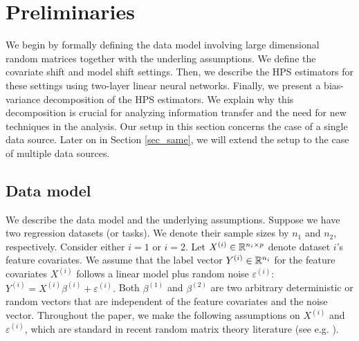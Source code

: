 \section{Preliminaries}\label{sec_HPS}
We begin by formally defining the data model involving large dimensional random matrices together with the underling assumptions.
We define the covariate shift and model shift settings.
Then, we describe the HPS estimators for these settings using two-layer linear neural networks.
Finally, we present a bias-variance decomposition of the HPS estimators.
We explain why this decomposition is crucial for analyzing information transfer and the need for new techniques in the analysis.
Our setup in this section concerns the case of a single data source.
Later on in Section \ref{sec_same}, we will extend the setup to the case of multiple data sources.

\subsection{Data model}\label{sec_data}

We describe the data model and the underlying assumptions.
Suppose we have two regression datasets (or tasks).
We denote their sample sizes by $n_1$ and $n_2$, respectively.
Consider either $i = 1$ or $i = 2$.
Let $X^{(i)} \in \mathbb{R}^{n_i \times p}$ denote dataset $i$'s feature covariates.
We assume that the label vector $Y^{(i)} \in \mathbb{R}^{n_i}$ for the feature covariates $X^{(i)}$ follows a linear model plus random noise $\varepsilon^{(i)}$:
$Y^{(i)}= X^{(i)}\beta^{(i)} + \varepsilon^{(i)}.$
Both $\beta^{(1)}$ and $\beta^{(2)}$ are two arbitrary deterministic or random vectors that are independent of the feature covariates and the noise vector.
Throughout the paper, we make the following assumptions on  $X^{(i)}$ and  $\varepsilon^{(i)}$, which are standard in recent  random matrix theory literature (see e.g. \citet{tulino2004random,bai2010spectral}). %

